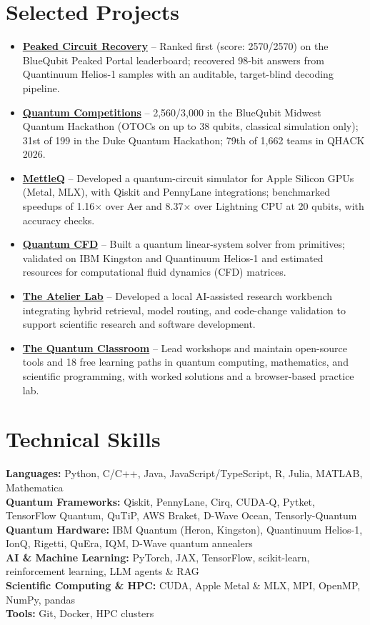 \documentclass[letterpaper,11pt]{article}
\newcommand{\cvsection}[1]{\needspace{4\baselineskip}\section{#1}}
\newcommand{\resumeItem}[1]{\item {\small #1}}
\begin{document}
\cvsection{Selected Projects}
\begin{itemize}[leftmargin=0pt,label={},itemsep=3pt,topsep=0pt,parsep=0pt]
  \resumeItem{\textbf{\href{https://github.com/MonitSharma/peaked_circuits}{Peaked Circuit Recovery}} -- Ranked first (score: 2570/2570) on the BlueQubit Peaked Portal leaderboard; recovered 98-bit answers from Quantinuum Helios-1 samples with an auditable, target-blind decoding pipeline.}
  \resumeItem{\textbf{\href{https://monitsharma.github.io/portfolio/projects/}{Quantum Competitions}} -- 2,560/3,000 in the BlueQubit Midwest Quantum Hackathon (OTOCs on up to 38 qubits, classical simulation only); 31st of 199 in the Duke Quantum Hackathon; 79th of 1,662 teams in QHACK 2026.}
  \resumeItem{\textbf{\href{https://github.com/MonitSharma/MettleQ}{MettleQ}} -- Developed a quantum-circuit simulator for Apple Silicon GPUs (Metal, MLX), with Qiskit and PennyLane integrations; benchmarked speedups of 1.16$\times$ over Aer and 8.37$\times$ over Lightning CPU at 20 qubits, with accuracy checks.}
  \resumeItem{\textbf{\href{https://github.com/MonitSharma/qsvt-linear-solvers}{Quantum CFD}} -- Built a quantum linear-system solver from primitives; validated on IBM Kingston and Quantinuum Helios-1 and estimated resources for computational fluid dynamics (CFD) matrices.}
  \resumeItem{\textbf{\href{https://github.com/MonitSharma/The-Atelier-Lab}{The Atelier Lab}} -- Developed a local AI-assisted research workbench integrating hybrid retrieval, model routing, and code-change validation to support scientific research and software development.}
  \resumeItem{\textbf{\href{https://monitsharma.github.io/}{The Quantum Classroom}} -- Lead workshops and maintain open-source tools and 18 free learning paths in quantum computing, mathematics, and scientific programming, with worked solutions and a browser-based practice lab.}
\end{itemize}


\cvsection{Technical Skills}
\begin{itemize}[leftmargin=0pt,label={},itemsep=3pt,topsep=0pt,parsep=0pt]
  \small{
  \item{
    \textbf{Languages:} Python, C/C++, Java, JavaScript/TypeScript, R, Julia, MATLAB, Mathematica \\
    \textbf{Quantum Frameworks:} Qiskit, PennyLane, Cirq, CUDA-Q, Pytket, TensorFlow Quantum, QuTiP, AWS Braket, D-Wave Ocean, Tensorly-Quantum \\
    \textbf{Quantum Hardware:} IBM Quantum (Heron, Kingston), Quantinuum Helios-1, IonQ, Rigetti, QuEra, IQM, D-Wave quantum annealers \\
    \textbf{AI \& Machine Learning:} PyTorch, JAX, TensorFlow, scikit-learn, reinforcement learning, LLM agents \& RAG \\
    \textbf{Scientific Computing \& HPC:} CUDA, Apple Metal \& MLX, MPI, OpenMP, NumPy, pandas \\
    \textbf{Tools:} Git, Docker, HPC clusters
  }}
\end{itemize}
\end{document}
